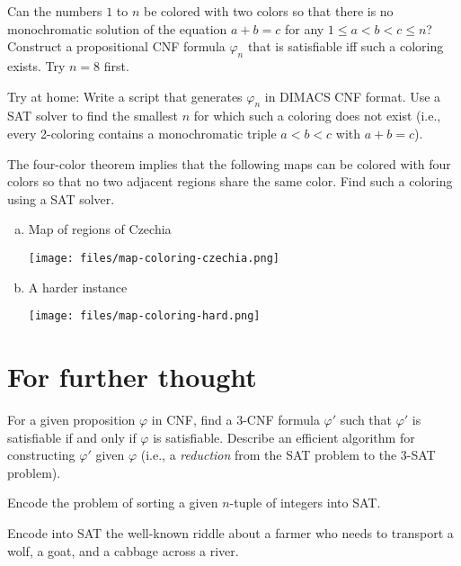 \begin{problem}
    Can the numbers $1$ to $n$ be colored with two colors so that there is no monochromatic solution of the equation
    $a+b=c$ for any $1\leq a<b<c\leq n$? Construct a propositional CNF formula $\varphi_n$ that is satisfiable iff such a coloring exists. Try $n=8$ first.
    
    Try at home: Write a script that generates $\varphi_n$ in DIMACS CNF format. Use a SAT solver to find the smallest $n$ for which such a coloring does not exist (i.e., every 2-coloring contains a monochromatic triple $a<b<c$ with $a+b=c$).
\end{problem}

    
\begin{problem}

    The four-color theorem implies that the following maps can be colored with four colors so that no two adjacent regions share the same color. Find such a coloring using a SAT solver.
    \begin{multicols}{2}
    \begin{enumerate}[(a)]
        \item Map of regions of Czechia  
        
        \vfill \texttt{[image: files/map-coloring-czechia.png]} \vfill
        
        \item A harder instance  
        
        \vfill \texttt{[image: files/map-coloring-hard.png]} \vfill
    \end{enumerate}
    \end{multicols}

\end{problem}



\section*{For further thought}
    
    
\begin{problem} 
    
    For a given proposition $\varphi$ in CNF, find a 3-CNF formula $\varphi'$ such that $\varphi'$ is satisfiable if and only if $\varphi$ is satisfiable. Describe an efficient algorithm for constructing $\varphi'$ given $\varphi$ (i.e., a \emph{reduction} from the SAT problem to the 3-SAT problem).

\end{problem}


\begin{problem}
    Encode the problem of sorting a given $n$-tuple of integers into SAT.
\end{problem}

\begin{problem}
    Encode into SAT the well-known riddle about a farmer who needs to transport a wolf, a goat, and a cabbage across a river.
\end{problem}

